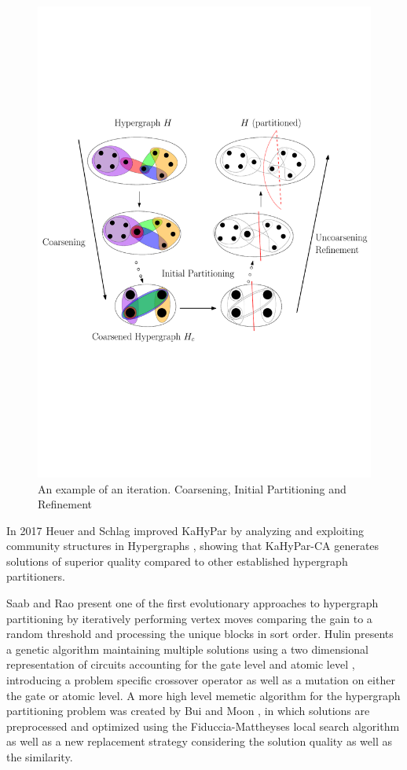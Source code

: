 \documentclass[a4paper,12pt,bibtotoc,titlepage, liststotoc,BCOR7mm,headsepline,pointlessnumbers]{scrbook}
\numberwithin{equation}{section}
\begin{document}
\begin{figure}[H] 
    \vspace*{-.25cm}
  \centering
   \includegraphics[width=.8\textwidth]{Ipe/Memetic_process.pdf}
  \caption{An example of an iteration. Coarsening, Initial Partitioning and Refinement}\label{fig:coarseningexample} %

\end{figure}
In 2017 Heuer and Schlag improved KaHyPar by analyzing and exploiting community structures in Hypergraphs \cite{heuer2017improving}, showing that KaHyPar-CA generates solutions of superior quality compared to other established hypergraph partitioners.


Saab and Rao \cite{saab1989evolution} present one of the first evolutionary approaches to hypergraph partitioning by iteratively performing vertex moves comparing the gain to a random threshold and processing the unique blocks in sort order. Hulin \cite{hulin1990circuit} presents a genetic algorithm maintaining multiple solutions using a two dimensional representation of circuits accounting for the gate level and atomic level , introducing a problem specific crossover operator as well as a mutation on either the gate or atomic level. A more high level memetic algorithm for the hypergraph partitioning problem was created by Bui and Moon \cite{bui1994fast}, in which solutions are preprocessed and optimized using the Fiduccia-Mattheyses \cite{fiduccia1988linear} local search algorithm as well as a new replacement strategy considering the solution quality as well as the similarity. 
\end{document}
